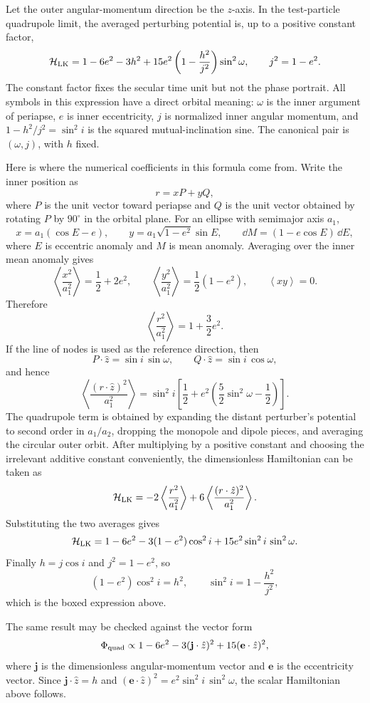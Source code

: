 \begin{derivation}
Let the outer angular-momentum direction be the \(z\)-axis.  In the
test-particle quadrupole limit, the averaged perturbing potential is, up to a
positive constant factor,
\[
  \mathcal H_{\rm LK}
  =
  1-6e^2-3h^2
  +15e^2\left(1-\frac{h^2}{j^2}\right)\sin^2\omega,
  \qquad
  j^2=1-e^2 .
\]
The constant factor fixes the secular time unit but not the phase portrait.
All symbols in this expression have a direct orbital meaning:
\(\omega\) is the inner argument of periapse, \(e\) is inner eccentricity,
\(j\) is normalized inner angular momentum, and
\(1-h^2/j^2=\sin^2 i\) is the squared mutual-inclination sine.  The canonical
pair is \((\omega,j)\), with \(h\) fixed.

Here is where the numerical coefficients in this formula come from.  Write the
inner position as
\[
  r=xP+yQ,
\]
where \(P\) is the unit vector toward periapse and \(Q\) is the unit vector
obtained by rotating \(P\) by \(90^\circ\) in the orbital plane.  For an ellipse
with semimajor axis \(a_1\),
\[
  x=a_1(\cos E-e),
  \qquad
  y=a_1\sqrt{1-e^2}\sin E,
  \qquad
  \dd M=(1-e\cos E)\,\dd E,
\]
where \(E\) is eccentric anomaly and \(M\) is mean anomaly.  Averaging over
the inner mean anomaly gives
\[
  \left\langle\frac{x^2}{a_1^2}\right\rangle
  =
  \frac12+2e^2,
  \qquad
  \left\langle\frac{y^2}{a_1^2}\right\rangle
  =
  \frac12(1-e^2),
  \qquad
  \left\langle xy\right\rangle=0.
\]
Therefore
\[
  \left\langle\frac{r^2}{a_1^2}\right\rangle
  =
  1+\frac32e^2 .
\]
If the line of nodes is used as the reference direction, then
\[
  P\cdot\hat z=\sin i\,\sin\omega,
  \qquad
  Q\cdot\hat z=\sin i\,\cos\omega,
\]
and hence
\[
  \left\langle\frac{(r\cdot\hat z)^2}{a_1^2}\right\rangle
  =
  \sin^2 i
  \left[
  \frac12+e^2\left(\frac52\sin^2\omega-\frac12\right)
  \right].
\]
The quadrupole term is obtained by expanding the distant perturber's potential
to second order in \(a_1/a_2\), dropping the monopole and dipole pieces, and
averaging the circular outer orbit.  After multiplying by a positive constant
and choosing the irrelevant additive constant conveniently, the dimensionless
Hamiltonian can be taken as
\[
  \mathcal H_{\rm LK}
  =
  -2\left\langle\frac{r^2}{a_1^2}\right\rangle
  +6\left\langle\frac{(r\cdot\hat z)^2}{a_1^2}\right\rangle .
\]
Substituting the two averages gives
\[
  \mathcal H_{\rm LK}
  =
  1-6e^2-3(1-e^2)\cos^2 i
  +15e^2\sin^2 i\,\sin^2\omega .
\]
Finally \(h=j\cos i\) and \(j^2=1-e^2\), so
\[
  (1-e^2)\cos^2 i=h^2,
  \qquad
  \sin^2 i=1-\frac{h^2}{j^2},
\]
which is the boxed expression above.

The same result may be checked against the vector form
\[
  \Phi_{\rm quad}
  \propto
  1-6e^2-3(\mathbf j\cdot \hat z)^2
  +15(\mathbf e\cdot \hat z)^2,
\]
where \(\mathbf j\) is the dimensionless angular-momentum vector and
\(\mathbf e\) is the eccentricity vector.  Since
\(\mathbf j\cdot\hat z=h\) and
\((\mathbf e\cdot\hat z)^2=e^2\sin^2 i\,\sin^2\omega\), the scalar Hamiltonian
above follows.
\end{derivation}

